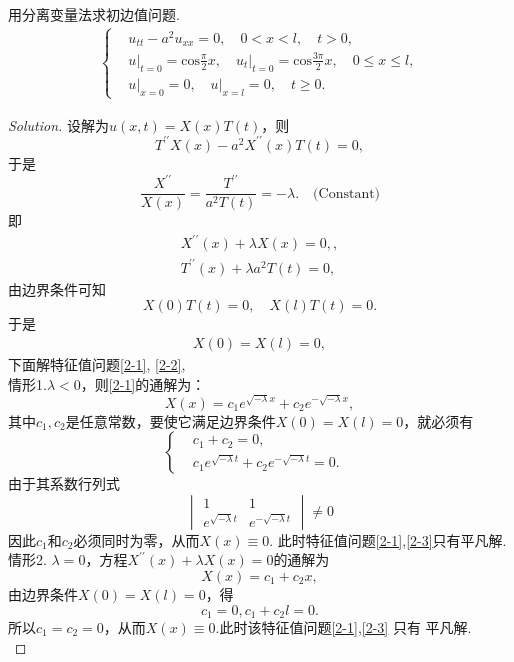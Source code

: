 \documentclass[cn,hazy,blue,14pt,screen]{elegantnote}
\begin{document}
	\begin{example}
		用分离变量法求初边值问题.
		\[\begin{array}{l}
		\left\{\begin{aligned}
		&u_{tt}-a^2u_{xx}=0, \quad 0< x < l,\quad t>0,\\
		&\left.u\right|_{t=0}=\mathrm{cos}\frac{\pi}{2}x,\quad 
		\left.u_t\right|_{t=0}=\mathrm{cos}\frac{3\pi}{2}x,\quad 0\le x\le l, \\
		&\left.u\right|_{x=0}=0,\quad \left.u\right|_{x=l}=0,\quad t\ge 0.
		\end{aligned}\right.
		\end{array}\] 
	\begin{proof}[Solution]
		设解为$u(x,t)=X(x)T(t)$，则
		$$T^{\prime \prime}X(x)-a^2X^{\prime \prime}(x)T(t)=0,$$
		于是
		$$\frac{X^{\prime \prime}}{X(x)}=\frac{T^{\prime 
				\prime}}{a^2T(t)}=-\lambda. \quad \text{(Constant)}$$
		即
		\begin{align}
		X^{\prime \prime}(x)+\lambda X(x)=0,\label{2-1},\\
		T^{\prime \prime}(x)+\lambda a^2T(t)=0,\label{2-2}
		\end{align}
		由边界条件可知
		$$X(0)T(t)=0,\quad X(l)T(t)=0.$$
		于是
		\begin{align}
		X(0)=X(l)=0,\label{2-3}
		\end{align}
		下面解特征值问题\eqref{2-1}, \eqref{2-2},\\
		情形1.\quad $\lambda<0$，则\eqref{2-1}的通解为：
		\begin{equation*}
		X(x)=c_1e^{\sqrt{-\lambda}x}+c_2e^{-\sqrt{-\lambda}x},
		\end{equation*}
		其中$c_1,c_2$是任意常数，要使它满足边界条件\(X(0)=X(l)=0\)，就必须有
		\begin{equation*}
		\left\{\begin{aligned}
		&c_1+c_2=0,\\
		&c_1e^{\sqrt{-\lambda}t}+c_2e^{-\sqrt{-\lambda}t}=0. &\nonumber
		\end{aligned}\right.
		\end{equation*}
		由于其系数行列式\\
		\begin{equation*}
		\begin{vmatrix}
		1 & 1\\
		e^{\sqrt{-\lambda}t} & e^{-\sqrt{-\lambda}t}
		\end{vmatrix}\ne 0
		\end{equation*}
		因此$c_1$和$c_2$必须同时为零，从而$X(x)\equiv 0$.\quad 
		此时特征值问题\eqref{2-1},\eqref{2-3}只有平凡解.\\
		情形2. \quad $\lambda=0$，方程\(X^{\prime \prime}(x)+\lambda X(x)=0\)的通解为
		\begin{equation*}
		X(x)=c_1+c_2x,
		\end{equation*}
		由边界条件\(X(0)=X(l)=0\)，得
		\begin{equation*}
		c_1=0,c_1+c_2l=0. 
		\end{equation*}
		所以$c_1=c_2=0$，从而$X(x)\equiv 0$.\quad 此时该特征值问题\eqref{2-1},\eqref{2-3}
		只有
		平凡解.\\
		

\end{proof}
\end{example}
\end{document}
